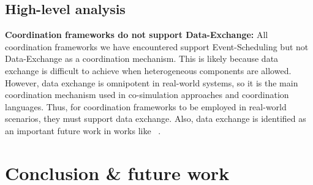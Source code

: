 \documentclass[runningheads]{llncs}
\begin{document}
\subsection{High-level analysis}

\textbf{Coordination frameworks do not support Data-Exchange:} All coordination frameworks we have encountered support \textsf{Event-Scheduling} but not \textsf{Data-Exchange} as a coordination mechanism.
This is likely because data exchange is difficult to achieve when heterogeneous components are allowed.
However, data exchange is omnipotent in real-world systems, so it is the main coordination mechanism used in co-simulation approaches and coordination languages.
Thus, for coordination frameworks to be employed in real-world scenarios, they must support data exchange.
Also, data exchange is identified as an important future work in works like ~\cite{krauterBehavioralConsistencyMultimodeling2023,varalarsenBCOolBehavioralCoordination2016}.

\section{Conclusion \& future work} \label{sec: conclusion}



\end{document}
